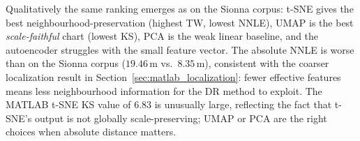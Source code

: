 Qualitatively the same ranking emerges as on the Sionna corpus: t-SNE
gives the best neighbourhood-preservation (highest TW, lowest NNLE),
UMAP is the best \emph{scale-faithful} chart (lowest KS), PCA is the
weak linear baseline, and the autoencoder struggles with the small
feature vector.
The absolute NNLE is worse than on the Sionna corpus
($19.46\,\text{m}$ vs.\ $8.35\,\text{m}$), consistent with the coarser
localization result in Section~\ref{sec:matlab_localization}: fewer
effective features means less neighbourhood information for the DR
method to exploit.
The MATLAB t-SNE KS value of $6.83$ is unusually large, reflecting the
fact that t-SNE's output is not globally scale-preserving; UMAP or PCA
are the right choices when absolute distance matters.


